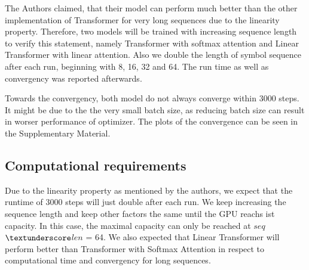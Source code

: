 \documentclass[DIV=13,fontsize=11pt]{scrartcl}
\begin{document}
The Authors claimed, that their model can perform much better than the other implementation of Transformer for very long sequences due to the linearity property. Therefore, two models will be trained with increasing sequence length to verify this statement, namely Transformer with softmax attention and Linear Transformer with linear attention. Also we double the length of symbol sequence after each run, beginning with 8, 16, 32 and 64. The run time as well as convergency was reported afterwards.

Towards the convergency, both model do not always converge within 3000 steps. It might be due to the the very small batch size, as reducing batch size can result in worser performance of optimizer. The plots of the convergence can be seen in the Supplementary Material.



\subsection{Computational requirements}
Due to the linearity property as mentioned by the authors, we expect that the runtime of 3000 steps will just double after each run. We keep increasing the sequence length and keep other factors the same until the GPU reachs ist capacity. In this case, the maximal capacity can only be reached at \(seq\)\(\textunderscore\)\(len\) = 64. We also expected that Linear Transformer will perform better than Transformer with Softmax Attention in respect to computational time and convergency for long sequences.


\end{document}
